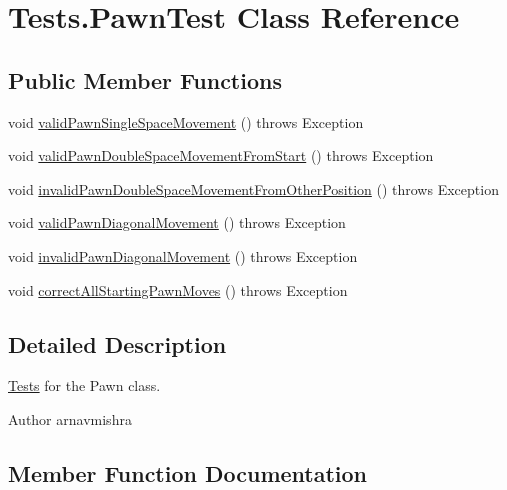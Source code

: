 \hypertarget{class_tests_1_1_pawn_test}{}\section{Tests.\+Pawn\+Test Class Reference}
\label{class_tests_1_1_pawn_test}
\subsection*{Public Member Functions}
\begin{DoxyCompactItemize}
\item 
void \hyperlink{class_tests_1_1_pawn_test_afc62c7df60ea48714139aa3b1fdec002}{valid\+Pawn\+Single\+Space\+Movement} ()  throws Exception 
\item 
void \hyperlink{class_tests_1_1_pawn_test_a609983048db9ea8be85c1a0eca1a4c64}{valid\+Pawn\+Double\+Space\+Movement\+From\+Start} ()  throws Exception 
\item 
void \hyperlink{class_tests_1_1_pawn_test_a62b592bc182e06d091c635fd46cf835b}{invalid\+Pawn\+Double\+Space\+Movement\+From\+Other\+Position} ()  throws Exception 
\item 
void \hyperlink{class_tests_1_1_pawn_test_aee76762875ad44ca3a078618467f4e87}{valid\+Pawn\+Diagonal\+Movement} ()  throws Exception 
\item 
void \hyperlink{class_tests_1_1_pawn_test_a5de98c4a33ad5690dda92cebdf5612a4}{invalid\+Pawn\+Diagonal\+Movement} ()  throws Exception 
\item 
void \hyperlink{class_tests_1_1_pawn_test_abddfebe793102a67725109bbe1a3ca31}{correct\+All\+Starting\+Pawn\+Moves} ()  throws Exception 
\end{DoxyCompactItemize}


\subsection{Detailed Description}
\hyperlink{namespace_tests}{Tests} for the Pawn class. \begin{DoxyAuthor}{Author}
arnavmishra 
\end{DoxyAuthor}


\subsection{Member Function Documentation}
\hypertarget{class_tests_1_1_pawn_test_abddfebe793102a67725109bbe1a3ca31}{}\label{class_tests_1_1_pawn_test_abddfebe793102a67725109bbe1a3ca31} 
